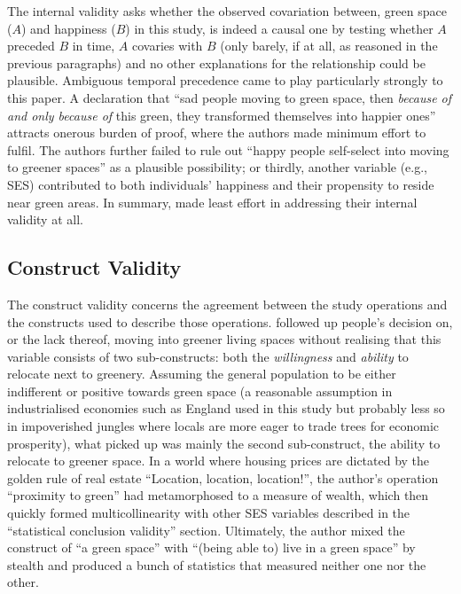 The internal validity asks whether the observed covariation between, green space ($A$) and happiness ($B$) in this study, is indeed a causal one by testing whether $A$ preceded $B$ in time, $A$ covaries with $B$ (only barely, if at all, as reasoned in the previous paragraphs) and no other explanations for the relationship could be plausible. Ambiguous temporal precedence came to play particularly strongly to this paper. A declaration that ``sad people moving to green space, then \emph{because of and only because of} this green, they transformed themselves into happier ones'' attracts onerous burden of proof, where the authors made minimum effort to fulfil. The authors further failed to rule out ``happy people self-select into moving to greener spaces'' as a plausible possibility; or thirdly, another variable (e.g., SES) contributed to both individuals' happiness and their propensity to reside near green areas. In summary, \textcite{white:2013} made least effort in addressing their internal validity at all.

\subsection{Construct Validity}

The construct validity concerns the agreement between the study operations and the constructs used to describe those operations. \textcite{white:2013} followed up people's decision on, or the lack thereof, moving into greener living spaces without realising that this variable consists of two sub-constructs: both the \emph{willingness} and \emph{ability} to relocate next to greenery. Assuming the general population to be either indifferent or positive towards green space (a reasonable assumption in industrialised economies such as England used in this study but probably less so in impoverished jungles where locals are more eager to trade trees for economic prosperity), what \textcite{white:2013} picked up was mainly the second sub-construct, the ability to relocate to greener space. In a world where housing prices are dictated by the golden rule of real estate ``Location, location, location!'', the author's operation ``proximity to green'' had metamorphosed to a measure of wealth, which then quickly formed multicollinearity with other SES variables described in the ``statistical conclusion validity'' section. Ultimately, the author mixed the construct of ``a green space'' with ``(being able to) live in a green space'' by stealth and produced a bunch of statistics that measured neither one nor the other.

